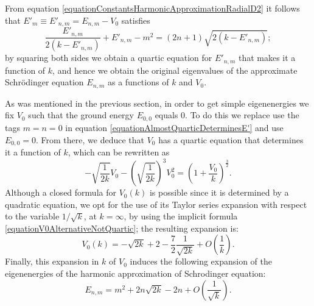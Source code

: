 From equation \eqref{equationConstantsHarmonicApproximationRadialD2} it follows that $E'_m \equiv E'_{n, m} = E_{n, m} - V_0$ satisfies
\begin{equation}\label{equationAlmostQuarticDeterminesE'}
    \frac{E'_{n, m}}{2(k - E'_{n, m})} + E'_{n, m} - m^2 = (2n+1) \sqrt{2(k - E'_{n, m})};
\end{equation}
by squaring both sides we obtain a quartic equation for $E'_{n,m}$ that makes it a function of $k$, and hence we obtain the original eigenvalues of the approximate Schr\"odinger equation $E_{n,m}$ as a functions of $k$ and $V_0$.

\lin

As was mentioned in the previous section, in order to get simple eigenenergies we fix $V_0$ such that the ground energy $E_{0, 0}$ equals $0$. To do this we replace use the tags $m = n = 0$ in equation \eqref{equationAlmostQuarticDeterminesE'} and use $E_{0, 0} = 0$. From there, we deduce that $V_0$ has a quartic equation that determines it a function of $k$, which can be rewritten as
\begin{equation}\label{equationV0AlternativeNotQuartic}
    - \sqrt{\frac{1}{2k}}V_0 - \left( \sqrt{\frac{1}{2k}} \right)^3 V_0^2 = \left( 1 + \frac{V_0}{k} \right)^\frac{3}{2}.
\end{equation}
Although a closed formula for $V_0(k)$ is possible since it is determined by a quadratic equation, we opt for the use of its Taylor series expansion with respect to the variable $1/\sqrt{k}$, at $k = \infty$, by using the implicit formula \eqref{equationV0AlternativeNotQuartic}; the resulting expansion is:
\begin{equation}\label{equationFormulaExpansionV0functionOfK}
    V_0(k) = - \sqrt{2k} + 2 - \frac{7}{2} \frac{1}{\sqrt{2k}} + O\left(\frac{1}{k}\right).
\end{equation}
Finally, this expansion in $k$ of $V_0$ induces the following expansion of the eigenenergies of the harmonic approximation of Schrodinger equation:
\begin{equation}\label{equationEigenEnergies2DSchrodingerSolutionsHarmonicApproximation}
    E_{n, m} = m^2 + 2n\sqrt{2k} - 2n + O\left(\frac{1}{\sqrt{k}}\right).
\end{equation}

\lin 

